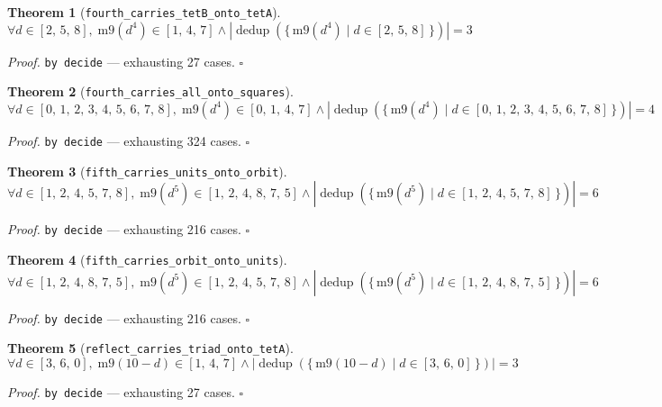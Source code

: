 \documentclass[11pt]{article}
\newtheorem{theorem}{Theorem}[section]
\begin{document}
\begin{theorem}[\texttt{fourth\_carries\_tetB\_onto\_tetA}]
\[ \forall d \in [2,\,5,\,8],\; \mathrm{m9}\mathopen{}\left(d^{4}\right) \in [1,\,4,\,7] \land \left|\operatorname{dedup}\left(\{\, \mathrm{m9}\mathopen{}\left(d^{4}\right) \mid d \in [2,\,5,\,8] \,\}\right)\right| = 3 \]
\end{theorem}
\noindent\emph{Proof.} \texttt{by decide} --- exhausting 27 cases. \hfill$\square$

\begin{theorem}[\texttt{fourth\_carries\_all\_onto\_squares}]
\[ \forall d \in [0,\,1,\,2,\,3,\,4,\,5,\,6,\,7,\,8],\; \mathrm{m9}\mathopen{}\left(d^{4}\right) \in [0,\,1,\,4,\,7] \land \left|\operatorname{dedup}\left(\{\, \mathrm{m9}\mathopen{}\left(d^{4}\right) \mid d \in [0,\,1,\,2,\,3,\,4,\,5,\,6,\,7,\,8] \,\}\right)\right| = 4 \]
\end{theorem}
\noindent\emph{Proof.} \texttt{by decide} --- exhausting 324 cases. \hfill$\square$

\begin{theorem}[\texttt{fifth\_carries\_units\_onto\_orbit}]
\[ \forall d \in [1,\,2,\,4,\,5,\,7,\,8],\; \mathrm{m9}\mathopen{}\left(d^{5}\right) \in [1,\,2,\,4,\,8,\,7,\,5] \land \left|\operatorname{dedup}\left(\{\, \mathrm{m9}\mathopen{}\left(d^{5}\right) \mid d \in [1,\,2,\,4,\,5,\,7,\,8] \,\}\right)\right| = 6 \]
\end{theorem}
\noindent\emph{Proof.} \texttt{by decide} --- exhausting 216 cases. \hfill$\square$

\begin{theorem}[\texttt{fifth\_carries\_orbit\_onto\_units}]
\[ \forall d \in [1,\,2,\,4,\,8,\,7,\,5],\; \mathrm{m9}\mathopen{}\left(d^{5}\right) \in [1,\,2,\,4,\,5,\,7,\,8] \land \left|\operatorname{dedup}\left(\{\, \mathrm{m9}\mathopen{}\left(d^{5}\right) \mid d \in [1,\,2,\,4,\,8,\,7,\,5] \,\}\right)\right| = 6 \]
\end{theorem}
\noindent\emph{Proof.} \texttt{by decide} --- exhausting 216 cases. \hfill$\square$

\begin{theorem}[\texttt{reflect\_carries\_triad\_onto\_tetA}]
\[ \forall d \in [3,\,6,\,0],\; \mathrm{m9}\mathopen{}\left(10 - d\right) \in [1,\,4,\,7] \land \left|\operatorname{dedup}\left(\{\, \mathrm{m9}\mathopen{}\left(10 - d\right) \mid d \in [3,\,6,\,0] \,\}\right)\right| = 3 \]
\end{theorem}
\noindent\emph{Proof.} \texttt{by decide} --- exhausting 27 cases. \hfill$\square$
\end{document}

